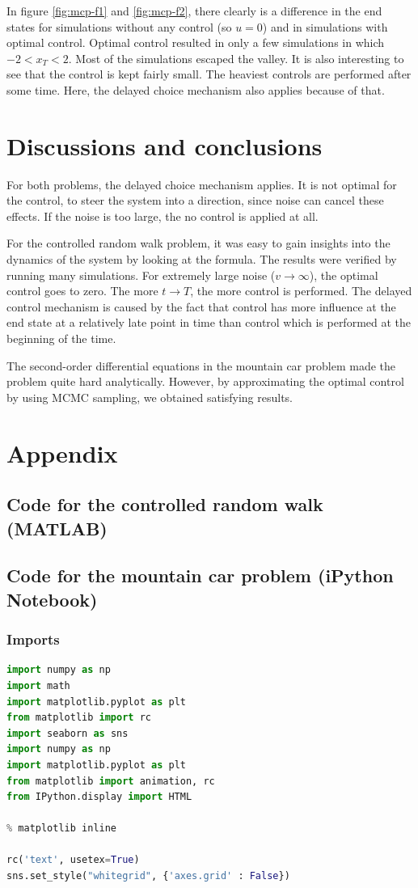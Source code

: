 \documentclass[10pt,a4paper]{article}
\begin{document}
In figure \ref{fig:mcp-f1} and \ref{fig:mcp-f2}, there clearly is a difference in the end states for simulations without any control (so $u=0$) and in simulations with optimal control. Optimal control resulted in only a few simulations in which $-2 < x_T < 2$. Most of the simulations escaped the valley. It is also interesting to see that the control is kept fairly small. The heaviest controls are performed after some time. Here, the delayed choice mechanism also applies because of that.

\section{Discussions and conclusions}
For both problems, the delayed choice mechanism applies. It is not optimal for the control, to steer the system into a direction, since noise can cancel these effects. If the noise is too large, the no control is applied at all.

For the controlled random walk problem, it was easy to gain insights into the dynamics of the system by looking at the formula. The results were verified by running many simulations. For extremely large noise ($v \rightarrow \infty$), the optimal control goes to zero. The more $t \rightarrow T$, the more control is performed. The delayed control mechanism is caused by the fact that control has more influence at the end state at a relatively late point in time than control which is performed at the beginning of the time.

The second-order differential equations in the mountain car problem made the problem quite hard analytically. However, by approximating the optimal control by using MCMC sampling, we obtained satisfying results.

\newpage
\section{Appendix}
\subsection{Code for the controlled random walk (MATLAB)}


\subsection{Code for the mountain car problem (iPython Notebook)}
\subsubsection{Imports}
\begin{lstlisting}[language=Python]
import numpy as np
import math
import matplotlib.pyplot as plt
from matplotlib import rc
import seaborn as sns
import numpy as np
import matplotlib.pyplot as plt
from matplotlib import animation, rc
from IPython.display import HTML

% matplotlib inline

rc('text', usetex=True)
sns.set_style("whitegrid", {'axes.grid' : False})
\end{lstlisting}
\end{document}
